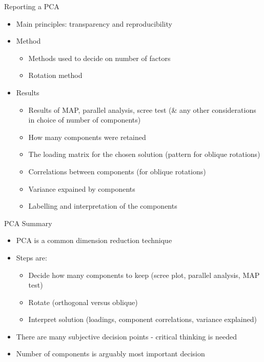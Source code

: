 \documentclass[
  ignorenonframetext,
]{beamer}
\providecommand{\tightlist}{%
  \setlength{\itemsep}{0pt}\setlength{\parskip}{0pt}}
\begin{document}
\begin{frame}{Reporting a PCA}
\protect\hypertarget{reporting-a-pca}{}

\begin{itemize}
\tightlist
\item
  Main principles: transparency and reproducibility
\item
  Method

  \begin{itemize}
  \tightlist
  \item
    Methods used to decide on number of factors
  \item
    Rotation method
  \end{itemize}
\item
  Results

  \begin{itemize}
  \tightlist
  \item
    Results of MAP, parallel analysis, scree test (\& any other
    considerations in choice of number of components)
  \item
    How many components were retained
  \item
    The loading matrix for the chosen solution (pattern for oblique
    rotations)
  \item
    Correlations between components (for oblique rotations)
  \item
    Variance expained by components
  \item
    Labelling and interpretation of the components
  \end{itemize}
\end{itemize}

\end{frame}

\begin{frame}{PCA Summary}
\protect\hypertarget{pca-summary}{}

\begin{itemize}
\tightlist
\item
  PCA is a common dimension reduction technique
\item
  Steps are:

  \begin{itemize}
  \tightlist
  \item
    Decide how many components to keep (scree plot, parallel analysis,
    MAP test)
  \item
    Rotate (orthogonal versus oblique)
  \item
    Interpret solution (loadings, component correlations, variance
    explained)
  \end{itemize}
\item
  There are many subjective decision points - critical thinking is
  needed
\item
  Number of components is arguably most important decision
\end{itemize}

\end{frame}
\end{document}
